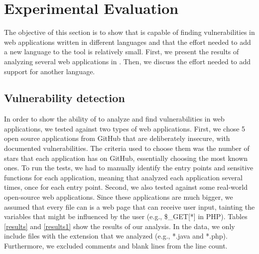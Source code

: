 \section{Experimental Evaluation}

The objective of this section is to show that \toolname{} is capable of finding vulnerabilities in web applications written in different languages and that the effort needed to add a new language to the tool is relatively small. First, we present the results of analyzing several web applications in \implangs{}. Then, we discuss the effort needed to add support for another language.

\subsection{Vulnerability detection}
In order to show the ability of \toolname{} to analyze and find vulnerabilities in web applications, we tested \toolname{} against two types of web applications. First, we chose 5 open source applications from GitHub that are deliberately insecure, with documented vulnerabilities. The criteria used to choose them was the number of stars that each application has on GitHub, essentially choosing the most known ones. To run the tests, we had to manually identify the entry points and sensitive functions for each application, meaning that \toolname{} analyzed each application several times, once for each entry point. Second, we also tested \toolname{} against some real-world open-source web applications. Since these applications are much bigger, we assumed that every file can is a web page that can receive user input, tainting the variables that might be influenced by the user (e.g., \$\_GET[*] in PHP). Tables \ref{results} and \ref{results1} show the results of our analysis. In the data, we only include files with the extension that we analyzed (e.g., *.java and *.php). Furthermore, we excluded comments and blank lines from the line count. 


